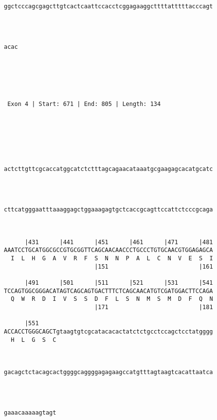 \documentclass{article}
\begin{document}
\begin{Verbatim}
                                                            
ggctcccagcgagcttgtcactcaattccacctcggagaaggcttttatttttacccagt
                                                            
                                                            
   
    
acac
    
    
  



 Exon 4 | Start: 671 | End: 805 | Length: 134 





   
                                                            
actcttgttcgcaccatggcatctctttagcagaacataaatgcgaagagcacatgcatc
                                                            
                                                            
   
                                                            
cttcatgggaatttaaaggagctggaaagagtgctcaccgcagttccattctcccgcaga
                                                            
                                                            
   
      |431      |441      |451      |461      |471      |481
AAATCCTGCATGGCGCCGTGCGGTTCAGCAACAACCCTGCCCTGTGCAACGTGGAGAGCA
  I  L  H  G  A  V  R  F  S  N  N  P  A  L  C  N  V  E  S  I
                          |151                          |161
   
      |491      |501      |511      |521      |531      |541
TCCAGTGGCGGGACATAGTCAGCAGTGACTTTCTCAGCAACATGTCGATGGACTTCCAGA
  Q  W  R  D  I  V  S  S  D  F  L  S  N  M  S  M  D  F  Q  N
                          |171                          |181
   
      |551                                                  
ACCACCTGGGCAGCTgtaagtgtcgcatacacactatctctgcctccagctcctatgggg
  H  L  G  S  C                                             
                                                            
   
                                                            
gacagctctacagcactggggcaggggagagaagccatgtttagtaagtcacattaatca
                                                            
                                                            
   
               
gaaacaaaaagtagt
               

\end{Verbatim}
\end{document}
